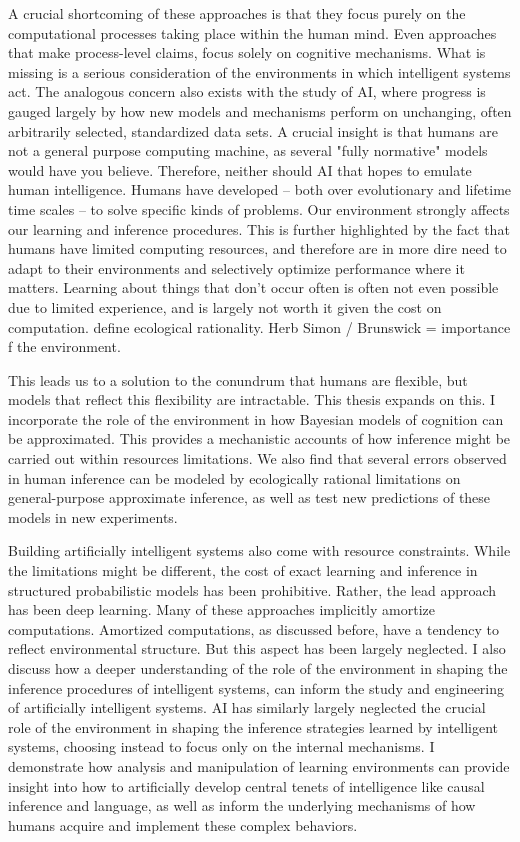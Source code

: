 A crucial shortcoming of these approaches is that they focus purely on the computational processes taking place within the human mind. Even approaches that make process-level claims, focus solely on cognitive mechanisms. What is missing is a serious consideration of the environments in which intelligent systems act. The analogous concern also exists with the study of AI, where progress is gauged largely by how new models and mechanisms perform on unchanging, often arbitrarily selected, standardized data sets. A crucial insight is that humans are not a general purpose computing machine, as several "fully normative" models would have you believe. Therefore, neither should AI that hopes to emulate human intelligence. Humans have developed -- both over evolutionary and lifetime time scales -- to solve specific kinds of problems. Our environment strongly affects our learning and inference procedures. This is further highlighted by the fact that humans have limited computing resources, and therefore are in more dire need to adapt to their environments and selectively optimize performance where it matters. Learning about things that don't occur often is often not even possible due to limited experience, and is largely not worth it given the cost on computation.  define ecological rationality.
Herb Simon / Brunswick = importance f the environment.

This leads us to a solution to the conundrum that humans are flexible, but models that reflect this flexibility are intractable. This thesis expands on this. I incorporate the role of the environment in how Bayesian models of cognition can be approximated. This provides a mechanistic accounts of how inference might be carried out within resources limitations. We also find that several errors observed in human inference can be modeled by ecologically rational limitations on general-purpose approximate inference, as well as test new predictions of these models in new experiments.

Building artificially intelligent systems also come with resource constraints. While the limitations might be different, the cost of exact learning and inference in structured probabilistic models has been prohibitive. Rather, the lead approach has been deep learning. Many of these approaches implicitly amortize computations. Amortized computations, as discussed before, have a tendency to reflect environmental structure. But this aspect has been largely neglected.  I also discuss how a deeper understanding of the role of the environment in shaping the inference procedures of intelligent systems, can inform the study and engineering of artificially intelligent systems. AI has similarly largely neglected the crucial role of the environment in shaping the inference strategies learned by intelligent systems, choosing instead to focus only on the internal mechanisms. I demonstrate how analysis and manipulation of learning environments can provide insight into how to artificially develop central tenets of intelligence like causal inference and language, as well as inform the underlying mechanisms of how humans acquire and implement these complex behaviors.

